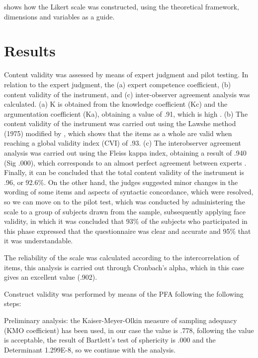 \documentclass[english]{textolivre}
\begin{document}
 shows how the Likert scale was constructed, using the theoretical framework, dimensions and variables as a guide.

\section{Results}\label{sec3results}
Content validity was assessed by means of expert judgment and pilot testing. In relation to the expert judgment, the (a) expert competence coefficient, (b) content validity of the instrument, and (c) inter-observer agreement analysis was calculated. (a) K is obtained from the knowledge coefficient (Kc) and the argumentation coefficient (Ka), obtaining a value of .91, which is high \cite{blasco2010}. %
(b) The content validity of the instrument was carried out using the Lawshe method (1975) modified by \textcite{tristan2008}, %
which shows that the items as a whole are valid when reaching a global validity index (CVI) of .93. (c) The interobserver agreement analysis was carried out using the Fleiss kappa index, obtaining a result of .940 (Sig .000), which corresponds to an almost perfect agreement between experts \cite{landis1977}. %
Finally, it can be concluded that the total content validity of the instrument is .96, or 92.6\%. On the other hand, the judges suggested minor changes in the wording of some items and aspects of syntactic concordance, which were resolved, so we can move on to the pilot test, which was conducted by administering the scale to a group of subjects drawn from the sample, subsequently applying face validity, in which it was concluded that 93\% of the subjects who participated in this phase expressed that the questionnaire was clear and accurate and 95\% that it was understandable.

The reliability of the scale was calculated according to the intercorrelation of items, this analysis is carried out through Cronbach's alpha, which in this case gives an excellent value (.902).

Construct validity was performed by means of the PFA following the following steps:

Preliminary analysis: the Kaiser-Meyer-Olkin measure of sampling adequacy (KMO coefficient) has been used, in our case the value is .778, following \textcite{kaiser1974} %
the value is acceptable, the result of Bartlett's test of sphericity is .000 and the Determinant 1.299E-8, so we continue with the analysis.
\end{document}
